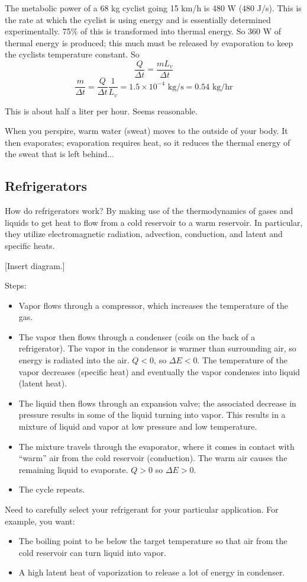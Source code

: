 The metabolic power of a 68 kg cyclist going 15 km/h is 480 W (480 J/s). This is the rate at which the cyclist is using energy and is essentially determined experimentally. 75\% of this is transformed into thermal energy. So 360 W of thermal energy is produced; this much must be released by evaporation to keep the cyclists temperature constant. So
$$\frac{Q}{\Delta{t}}=\frac{mL_v}{\Delta{t}}$$
$$\frac{m}{\Delta{t}}=\frac{Q}{\Delta{t}}\frac{1}{L_v}=1.5\times 10^{-4}\mbox{ kg/s}=0.54\mbox{ kg/hr}$$

This is about half a liter per hour. Seems reasonable.

When you perspire, warm water (sweat) moves to the outside of your body. It then evaporates; evaporation requires heat, so it reduces the thermal energy of the sweat that is left behind...


\subsection{Refrigerators}
How do refrigerators work? By making use of the thermodynamics of gases and liquids to get heat to flow from a cold reservoir to a warm reservoir. In particular, they utilize electromagnetic radiation, advection, conduction, and latent and specific heats.

[Insert diagram.]\nopagebreak
\vspace{6cm}


Steps:
\begin{itemize}
\item Vapor flows through a compressor, which increases the temperature of the gas.
\item The vapor then flows through a condenser (coils on the back of a refrigerator). The vapor in the condensor is warmer than surrounding air, so energy is radiated into the air. $Q<0$, so $\Delta E<0$. The temperature of the vapor decreases (specific heat) and eventually the vapor condenses into liquid (latent heat).
\item The liquid then flows through an expansion valve; the associated decrease in pressure results in some of the liquid turning into vapor. This results in a mixture of liquid and vapor at low pressure and low temperature.
\item The mixture travels through the evaporator, where it comes in contact with ``warm'' air from the cold reservoir (conduction). The warm air causes the remaining liquid to evaporate. $Q>0$ so $\Delta E>0$.
\item The cycle repeats.
\end{itemize}

Need to carefully select your refrigerant for your particular application. For example, you want:
\begin{itemize}
\item The boiling point to be below the target temperature so that air from the cold reservoir can turn liquid into vapor.
\item A high latent heat of vaporization to release a lot of energy in condenser.
\end{itemize}







\clearpage
